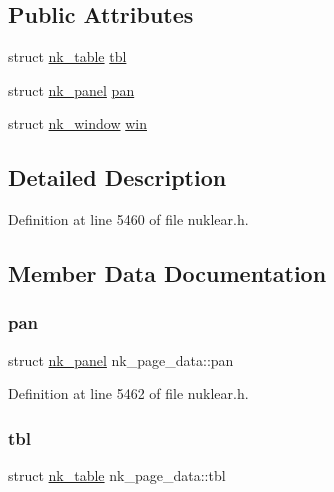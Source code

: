 \subsection*{Public Attributes}
\begin{DoxyCompactItemize}
\item 
struct \mbox{\hyperlink{structnk__table}{nk\+\_\+table}} \mbox{\hyperlink{unionnk__page__data_a825b989765fecd6442058144d9554894}{tbl}}
\item 
struct \mbox{\hyperlink{structnk__panel}{nk\+\_\+panel}} \mbox{\hyperlink{unionnk__page__data_ae0a8e6dafef7b65c846d19571209d2dc}{pan}}
\item 
struct \mbox{\hyperlink{structnk__window}{nk\+\_\+window}} \mbox{\hyperlink{unionnk__page__data_ae954192e5736fbedeb8b4a9242d6d13a}{win}}
\end{DoxyCompactItemize}


\subsection{Detailed Description}


Definition at line 5460 of file nuklear.\+h.



\subsection{Member Data Documentation}
\mbox{\label{unionnk__page__data_ae0a8e6dafef7b65c846d19571209d2dc}} 
\subsubsection{\texorpdfstring{pan}{pan}}
{\footnotesize\ttfamily struct \mbox{\hyperlink{structnk__panel}{nk\+\_\+panel}} nk\+\_\+page\+\_\+data\+::pan}



Definition at line 5462 of file nuklear.\+h.

\mbox{\label{unionnk__page__data_a825b989765fecd6442058144d9554894}} 
\subsubsection{\texorpdfstring{tbl}{tbl}}
{\footnotesize\ttfamily struct \mbox{\hyperlink{structnk__table}{nk\+\_\+table}} nk\+\_\+page\+\_\+data\+::tbl}



